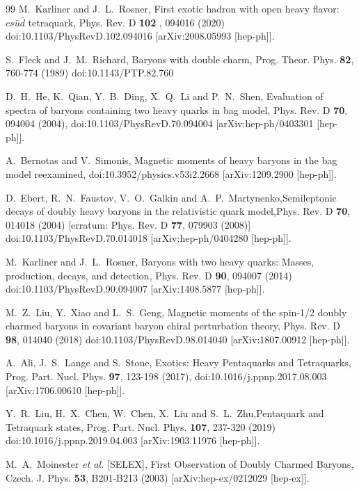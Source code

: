 \documentclass[12pt,onecolumn,floatfix,nofootinbib]{revtex4}
\begin{document}
\begin{thebibliography}{99}
 M.~Karliner and J.~L.~Rosner, First exotic hadron
with open heavy flavor: $cs\bar u\bar d$ tetraquark, Phys. Rev. D \textbf{102%
}, 094016 (2020) doi:10.1103/PhysRevD.102.094016 [arXiv:2008.05993 [hep-ph]].

 S.~Fleck and J.~M.~Richard, Baryons with double
charm, Prog. Theor. Phys. \textbf{82}, 760-774 (1989) doi:10.1143/PTP.82.760

 D.~H.~He, K.~Qian, Y.~B.~Ding, X.~Q.~Li and P.~N.~Shen,
Evaluation of spectra of baryons containing two heavy quarks in bag model,
Phys. Rev. D \textbf{70}, 094004 (2004), doi:10.1103/PhysRevD.70.094004
[arXiv:hep-ph/0403301 [hep-ph]].

 A.~Bernotas and V.~Simonis, Magnetic moments of
heavy baryons in the bag model reexamined, doi:10.3952/physics.v53i2.2668
[arXiv:1209.2900 [hep-ph]].

 D.~Ebert, R.~N.~Faustov, V.~O.~Galkin and
A.~P.~Martynenko,Semileptonic decays of doubly heavy baryons in the
relativistic quark model,Phys. Rev. D \textbf{70}, 014018 (2004) [erratum:
Phys. Rev. D \textbf{77}, 079903 (2008)] doi:10.1103/PhysRevD.70.014018
[arXiv:hep-ph/0404280 [hep-ph]].

 M.~Karliner and J.~L.~Rosner, Baryons with two heavy
quarks: Masses, production, decays, and detection, Phys. Rev. D \textbf{90},
094007 (2014) doi:10.1103/PhysRevD.90.094007 [arXiv:1408.5877 [hep-ph]].

 M.~Z.~Liu, Y.~Xiao and L.~S.~Geng, Magnetic moments of
the spin-1/2 doubly charmed baryons in covariant baryon chiral perturbation
theory, Phys. Rev. D \textbf{98}, 014040 (2018)
doi:10.1103/PhysRevD.98.014040 [arXiv:1807.00912 [hep-ph]].

 A.~Ali, J.~S.~Lange and S.~Stone, Exotics: Heavy
Pentaquarks and Tetraquarks, Prog. Part. Nucl. Phys. \textbf{97}, 123-198
(2017), doi:10.1016/j.ppnp.2017.08.003 [arXiv:1706.00610 [hep-ph]].

 Y.~R.~Liu, H.~X.~Chen, W.~Chen, X.~Liu and
S.~L.~Zhu,Pentaquark and Tetraquark states, Prog. Part. Nucl. Phys. \textbf{%
107}, 237-320 (2019) doi:10.1016/j.ppnp.2019.04.003 [arXiv:1903.11976
[hep-ph]].

 M.~A.~Moinester \textit{et al.} [SELEX], First
Observation of Doubly Charmed Baryons, Czech. J. Phys. \textbf{53},
B201-B213 (2003) [arXiv:hep-ex/0212029 [hep-ex]].


\end{thebibliography}
\end{document}
